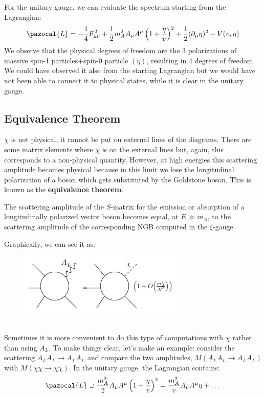 \documentclass[../main.tex]{subfiles}
\begin{document}
For the unitary gauge, we can evaluate the spectrum starting from the Lagrangian:
\[
\pazocal{L}=-\frac{1}{4}F_{\mu\nu}^2+\frac{1}{2}m_A^2A_\mu A^\mu\left(1+\frac{\eta}{v}\right)^2+\frac{1}{2}(\partial_\mu\eta)^2-V(v,\eta)
\]
We observe that the physical degrees of freedom are the 3 polarizations of massive spin-1 particles+spin-0 particle $(\eta)$, resulting in 4 degrees of freedom. We could have observed it also from the starting Lagrangian but we would have not been able to connect it to physical states, while it is clear in the unitary gauge.
\subsection{Equivalence Theorem}
$\chi$ is not physical, it cannot be put on external lines of the diagrams. There are some matrix elements where $\chi$ is on the external lines but, again, this corresponds to a non-physical quantity. However, at high energies this scattering amplitude becomes physical because in this limit we lose the longitudinal polarization of a boson which gets substituted by the Goldstone boson. This is known as the \textbf{equivalence theorem}.
\begin{theorem}
The scattering amplitude of the $S$-matrix for the emission or absorption of a longitudinally polarized vector boson becomes equal, at $E\gg m_A$, to the scattering amplitude of the corresponding NGB computed in the $\xi$-gauge.
\end{theorem}
Graphically, we can see it as:
\begin{figure}[h]
    \centering
    \includegraphics[width=0.7\textwidth]{Images/eqthm.pdf}
    \caption*{}
    \label{fig:my_label}
\end{figure}\\
Sometimes it is more convenient to do this type of computations with $\chi$ rather than using $A_L$. To make things clear, let's make an example: consider the scattering $A_LA_L\to A_LA_L$ and compare the two amplitudes, $M(A_LA_L\to A_LA_L)$ with $M(\chi\chi\to\chi\chi)$.   
In the unitary gauge, the Lagrangian contains:
\[
\pazocal{L}\supset\frac{m_A^2}{2}A_\mu A^\mu\left(1+\frac{\eta}{v}\right)^2=\frac{m_A^2}{v}A_\mu A^\mu\eta+\dots
\]
\end{document}
